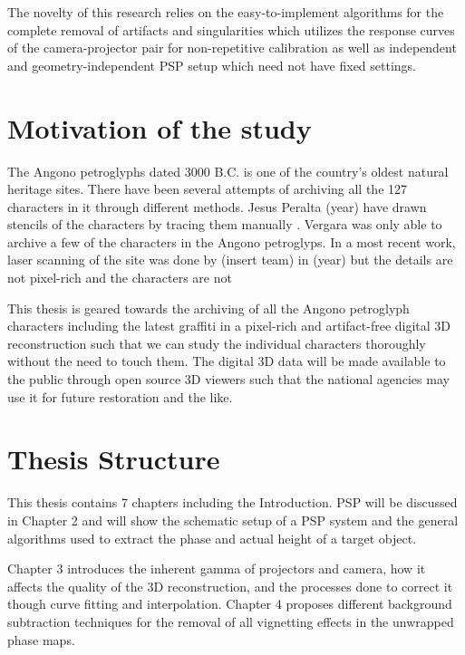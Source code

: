 The novelty of this research relies on the easy-to-implement algorithms for the complete removal of artifacts and singularities which utilizes the response curves of the camera-projector pair for non-repetitive calibration as well as independent and geometry-independent PSP setup which need not have fixed settings.


\section{Motivation of the study}

The Angono petroglyphs dated 3000 B.C. is one of the country's oldest natural heritage sites. There have been several attempts of archiving all the 127 characters in it through different methods. Jesus Peralta (year) have drawn stencils of the characters by tracing them manually \cite{Peralta}. 
Vergara was only able to archive a few of the characters in the Angono petroglyps.
In a most recent work, laser scanning of the site was done by (insert team) in (year) but the details are not pixel-rich and the characters are not 

This thesis is geared towards the archiving of all the Angono petroglyph characters including the latest graffiti in a pixel-rich and artifact-free digital 3D reconstruction such that we can study the individual characters thoroughly without the need to touch them. The digital 3D data will be made available to the public through open source 3D viewers such that the national agencies may use it for future restoration and the like.

\section{Thesis Structure}

This thesis contains 7 chapters including the Introduction. PSP will be discussed in Chapter 2 and will show the schematic setup of a PSP system and the general algorithms used to extract the phase and actual height of a target object. 

Chapter 3 introduces the inherent gamma of projectors and camera, how it affects the quality of the 3D reconstruction, and the processes done to correct it though curve fitting and interpolation. 
Chapter 4 proposes different background subtraction techniques for the removal of all vignetting effects in the unwrapped phase maps. 

